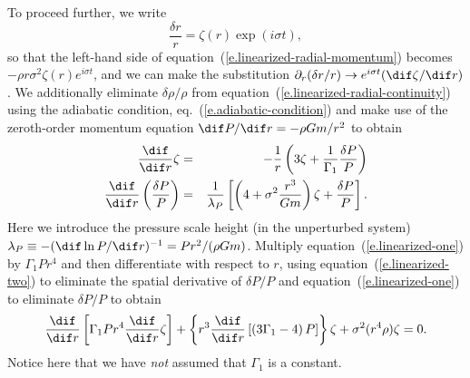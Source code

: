 To proceed further, we write
\[ \frac{\delta r}{r} = \zeta(r) \exp(i\sigma t), \]
so that the left-hand side of equation~(\ref{e.linearized-radial-momentum}) becomes $-\rho r \sigma^{2}\zeta(r) e^{i\sigma t}$, and we can make the substitution $\partial_{r} (\delta r/r) \to e^{i\sigma t}(\dif \zeta/\dif r)$.  We additionally eliminate $\delta \rho/\rho$ from equation~(\ref{e.linearized-radial-continuity}) using the adiabatic condition, eq.~(\ref{e.adiabatic-condition}) and make use of the zeroth-order momentum equation $\dif P/\dif r = -\rho Gm/r^{2}$ to obtain
\begin{eqnarray}
\label{e.linearized-one}
\frac{\dif}{\dif r}\zeta &=& -\frac{1}{r}\left(3\zeta + \frac{1}{\Gamma_{1}}\frac{\delta P}{P}\right)\\
\label{e.linearized-two}
\frac{\dif}{\dif r}\left(\frac{\delta P}{P}\right) &=& \frac{1}{\lambda_{P}}\left[\left( 4+ \sigma^{2}\frac{r^{3}}{Gm}\right)\zeta + \frac{\delta P}{P}\right].
\end{eqnarray}
Here we introduce the pressure scale height (in the unperturbed system) $\lambda_{P} \equiv -(\dif \ln P/\dif r)^{-1} = P r^{2}/(\rho Gm)$.  Multiply equation~(\ref{e.linearized-one}) by $\Gamma_{1} P r^{4}$ and then differentiate with respect to $r$, using equation~(\ref{e.linearized-two}) to eliminate the spatial derivative of $\delta P/P$ and equation~(\ref{e.linearized-one}) to eliminate $\delta P/P$ to obtain
\begin{equation}\label{e.LAWE}
\frac{\dif}{\dif r}\left[ \Gamma_{1}P r^{4} \frac{\dif}{\dif r}\zeta\right] + \left\{ r^{3}\frac{\dif}{\dif r}\left[\left( 3\Gamma_{1}-4\right)P\right]\right\} \zeta + \sigma^{2} (r^{4}\rho) \zeta = 0.
\end{equation}
Notice here that we have \emph{not} assumed that $\Gamma_{1}$ is a constant.

